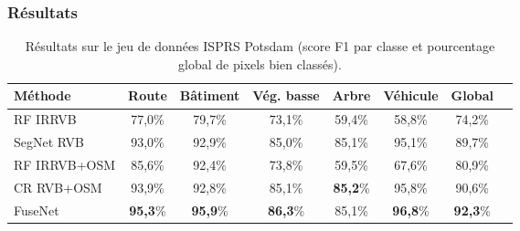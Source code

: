 
\subsubsection{Résultats}

\begin{table}[t]
	\caption{Résultats sur le jeu de données \gls{ISPRS} Potsdam (score F1 par classe et pourcentage global de pixels bien classés).}
    \label{table_potsdam_results}
	\begin{tabularx}{\textwidth}{Y c c c c c c c}
    \toprule
    Méthode                 & Route     & Bâtiment& Vég. basse  & Arbre   & Véhicule & Global\\
    \midrule
    RF \gls{IRRVB}          & 77,0\%    & 79,7\%  & 73,1\%      & 59,4\%  & 58,8\%   & 74,2\%\\
    SegNet \gls{RVB}        & 93,0\%    &	92,9\%	&	85,0\%      &	85,1\%  &	95,1\%	 & 89,7\%\\
    \midrule
    RF \gls{IRRVB}+\gls{OSM}& 85,6\%    & 92,4\%  & 73,8\%      & 59,5\%  & 67,6\%   & 80,9\%\\
    CR \gls{RVB}+\gls{OSM}  &	93,9\%    &	92,8\%	&	85,1\%		  &	\textbf{85,2}\%    &	95,8\%	&	90,6\%\\
    FuseNet                 &	\textbf{95,3}\%	&	\textbf{95,9}\%	&	\textbf{86,3}\%	   &	85,1\%	&	\textbf{96,8}\%	&	\textbf{92,3}\%\\
    \bottomrule
    \end{tabularx}
\end{table}


